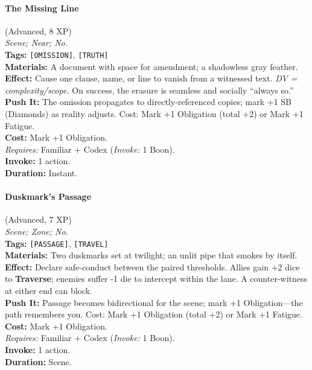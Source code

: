 \paragraph{The Missing Line} (Advanced, 8 XP) \hfill \\
\emph{Scene; Near; No.} \\
\textbf{Tags:} \texttt{[OMISSION]}, \texttt{[TRUTH]} \\
\textbf{Materials:} A document with space for amendment; a shadowless gray feather. \\
\textbf{Effect:} Cause one clause, name, or line to vanish from a witnessed text. \emph{DV = complexity/scope.} On success, the erasure is seamless and socially ``always so.'' \\
\textbf{Push It:} The omission propagates to directly-referenced copies; mark +1 SB (Diamonds) as reality adjusts. Cost: Mark +1 Obligation (total +2) or Mark +1 Fatigue. \\
\textbf{Cost:} Mark +1 Obligation. \\
\textit{Requires:} Familiar + Codex (\textit{Invoke:} 1 Boon). \\
\textbf{Invoke:} 1 action. \\
\textbf{Duration:} Instant.

\paragraph{Duskmark's Passage} (Advanced, 7 XP) \hfill \\
\emph{Scene; Zone; No.} \\
\textbf{Tags:} \texttt{[PASSAGE]}, \texttt{[TRAVEL]} \\
\textbf{Materials:} Two duskmarks set at twilight; an unlit pipe that smokes by itself. \\
\textbf{Effect:} Declare safe-conduct between the paired thresholds. Allies gain +2 dice to \textbf{Traverse}; enemies suffer -1 die to intercept within the lane. A counter-witness at either end can block. \\
\textbf{Push It:} Passage becomes bidirectional for the scene; mark +1 Obligation---the path remembers you. Cost: Mark +1 Obligation (total +2) or Mark +1 Fatigue. \\
\textbf{Cost:} Mark +1 Obligation. \\
\textit{Requires:} Familiar + Codex (\textit{Invoke:} 1 Boon). \\
\textbf{Invoke:} 1 action. \\
\textbf{Duration:} Scene.

